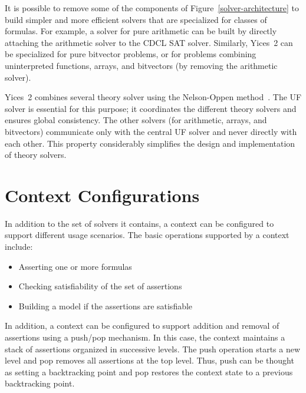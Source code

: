 \documentclass[11pt,twoside,fleqn,openright,titlepage]{cslreport}
\begin{document}
It   is    possible   to   remove   some   of    the   components   of
Figure~\ref{solver-architecture} to  build simpler and  more efficient
solvers that are specialized for  classes of formulas.  For example, a
solver  for pure  arithmetic can  be built  by directly  attaching the
arithmetic solver to  the CDCL SAT solver.  Similarly,  Yices~2 can be
specialized  for pure  bitvector problems,  or for  problems combining
uninterpreted  functions,  arrays,  and  bitvectors (by  removing  the
arithmetic solver).

Yices~2  combines   several  theory  solver   using  the  Nelson-Oppen
method~\cite{NelsonOppen79}.   The  UF solver  is  essential for  this
purpose;  it  coordinates the  different  theory  solvers and  ensures
global  consistency. The  other solvers  (for arithmetic,  arrays, and
bitvectors)  communicate only  with the  central UF  solver  and never
directly with  each other.  This property considerably  simplifies the
design and implementation of theory solvers.

\section{Context Configurations}
\label{features}

In  addition to  the set  of  solvers it  contains, a  context can  be
configured to support different  usage scenarios. The basic operations
supported by a context include:
\begin{itemize}
\item Asserting one or more formulas
\item Checking satisfiability of the set of assertions
\item Building a model if the assertions are satisfiable
\end{itemize}
In  addition, a  context can  be  configured to  support addition  and
removal of assertions  using a push/pop mechanism.  In  this case, the
context  maintains  a  stack  of assertions  organized  in  successive
levels.  The  push operation  starts a new  level and pop  removes all
assertions at the  top level.  Thus, push can be  thought as setting a
backtracking point  and pop restores  the context state to  a previous
backtracking point.
\end{document}
